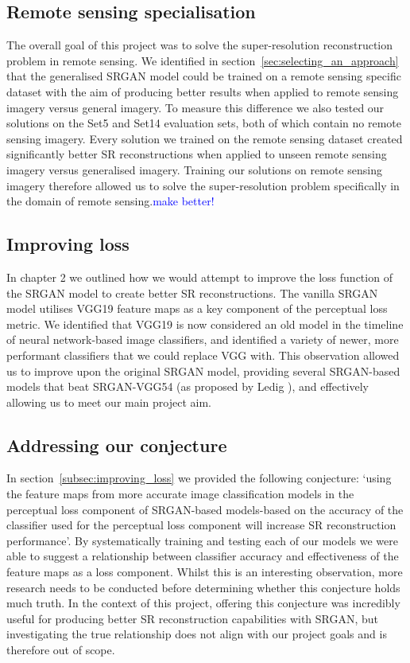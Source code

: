 \subsection{Remote sensing specialisation}
The overall goal of this project was to solve the super-resolution reconstruction problem in remote sensing. We identified in section~\ref{sec:selecting_an_approach} that the generalised SRGAN model could be trained on a remote sensing specific dataset with the aim of producing better results when applied to remote sensing imagery versus general imagery. To measure this difference we also tested our solutions on the Set5 and Set14 evaluation sets, both of which contain no remote sensing imagery. Every solution we trained on the remote sensing dataset created significantly better SR reconstructions when applied to unseen remote sensing imagery versus generalised imagery. Training our solutions on remote sensing imagery therefore allowed us to solve the super-resolution problem specifically in the domain of remote sensing.\textcolor{blue}{make better!}

\subsection{Improving loss}
In chapter 2 we outlined how we would attempt to improve the loss function of the SRGAN model to create better SR reconstructions. The vanilla SRGAN model utilises VGG19 feature maps as a key component of the perceptual loss metric. We identified that VGG19 is now considered an old model in the timeline of neural network-based image classifiers, and identified a variety of newer, more performant classifiers that we could replace VGG with. This observation allowed us to improve upon the original SRGAN model, providing several SRGAN-based models that beat SRGAN-VGG54 (as proposed by Ledig \etal), and effectively allowing us to meet our main project aim.

\subsection{Addressing our conjecture}
In section~\ref{subsec:improving_loss} we provided the following conjecture: `using the feature maps from more accurate image classification models in the perceptual loss component of SRGAN-based models-based on the accuracy of the classifier used for the perceptual loss component will increase SR reconstruction performance'. By systematically training and testing each of our models we were able to suggest a relationship between classifier accuracy and effectiveness of the feature maps as a loss component. Whilst this is an interesting observation, more research needs to be conducted before determining whether this conjecture holds much truth. In the context of this project, offering this conjecture was incredibly useful for producing better SR reconstruction capabilities with SRGAN, but investigating the true relationship does not align with our project goals and is therefore out of scope.

